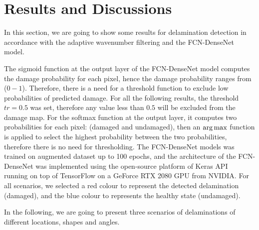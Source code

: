 \section{Results and Discussions}
In this section, we are going to show some results for delamination detection in accordance with the adaptive wavenumber filtering and the FCN-DenseNet model. 
	
The sigmoid function at the output layer of the FCN-DenseNet model computes the damage probability for each pixel, hence the damage probability ranges from (\(0 - 1\)).
Therefore, there is a need for a threshold function to exclude low probabilities of predicted damage. 
For all the following results, the threshold \(tr = 0.5\) was set, therefore any value less than \(0.5\) will be excluded from the damage map.
For the softmax function at the output layer, it computes two probabilities for each pixel: (damaged and undamaged), then an \(\operatorname*{arg\,max}\) function is applied to select the highest probability between the two probabilities, therefore there is no need for thresholding. 
The FCN-DenseNet models was trained on augmented dataset up to 100 epochs, and the architecture of the FCN-DenseNet  was implemented using the open-source platform of Keras API~\cite{chollet2015keras} running on top of TensorFlow on a GeForce RTX 2080  GPU from NVIDIA.
For all scenarios, we selected a red colour to represent the detected delamination (damaged), and the blue colour to represents the healthy state (undamaged).
	
In the following, we are going to present three scenarios of delaminations of different locations, shapes and angles.

